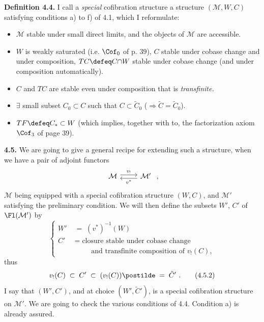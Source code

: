 \textbf{Definition 4.4.} I call a \textit{special} cofibration structure a structure $(\mathcal{M}, W, C)$ satisfying conditions a) to f) of 4.1, which I reformulate:
\begin{itemize}[leftmargin=3em]
\item[\circled{a}] $\mathcal{M}$ stable under small direct limits, and the objects of $\mathcal{M}$ are accessible.
\item[\circled{b}] $W$ is weakly saturated (i.e. $\Cof_0$ of p. 39), $C$ stable under cobase change and under composition, $TC \defeq C{\cap}W$ stable under cobase change (and under composition automatically).
\item[\circled{b$'$}] $C$ and $TC$ are stable even under composition that is \textit{transfinite.}
\item[\circled{c}] $\exists$ small subset $C_0 \subset C$ such that $C \subset \tilde{C}_0$ ($\Longrightarrow \tilde{C} = \tilde{C}_0$).
\item[\circled{d}] $TF \defeq C_* \subset W$ (which implies, together with to, the factorization axiom $\Cof_3$ of page 39).
\end{itemize}

\textbf{4.5.} We are going to give a general recipe for extending such a structure, when we have a pair of adjoint functors
\[
\begin{tikzcd}
\mathcal{M} \arrow[r, shift left, "v_!"] & \mathcal{M}' \arrow[l, shift left, "v^*"]
\end{tikzcd}
\ ,
\]
$\mathcal{M}$ being equipped with a special cofibration structure $(W, C)$, and $\mathcal{M}'$ satisfying the preliminary condition. We will then define the subsets $W'$, $C'$ of $\Fl(\mathcal{M}')$
by
\[
\left\{
\begin{aligned}
W' \;&=\; (v^*)^{-1}(W) \\
C' \;&=\; \text{closure stable under cobase change} \\
&\phantom{\;=\;}\ \ \text{and transfinite composition of } v_!(C),
\end{aligned}
\right. \tag*{(4.5.1)}
\]
thus
\[
v_!(C) \;\subset\; C' \;\subset\; (v_!(C))\postilde \;=\; \tilde{C}'\ . \tag*{(4.5.2)}
\]
I say that $(W', C')$, and at choice $(W', \tilde{C}')$, is a special cofibration structure on $\mathcal{M}'$. We are going to check the various conditions of 4.4. Condition a) is already assured.

